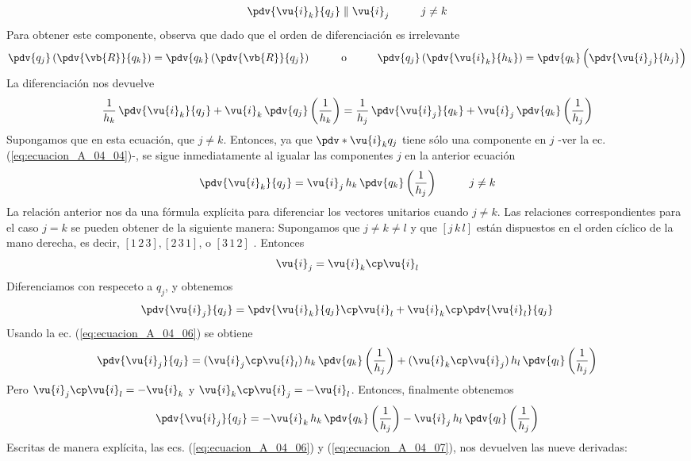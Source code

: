 \begin{align}
\pdv{\vu{i}_{k}}{q_{j}} \parallel \vu{i}_{j} \hspace{1cm} j \neq k 
\label{eq:ecuacion_A_04_04}    
\end{align}
Para obtener este componente, observa que dado que el orden de diferenciación es irrelevante
\begin{align*}
\pdv{q_{j}} \left( \pdv{\vb{R}}{q_{k}} \right) = \pdv{q_{k}} \left( \pdv{\vb{R}}{q_{j}} \right) \hspace{1cm} \mbox{o} \hspace{1cm} \pdv{q_{j}} \left( \pdv{\vu{i}_{k}}{h_{k}} \right) = \pdv{q_{k}} \left( \pdv{\vu{i}_{j}}{h_{j}} \right)
\end{align*}
La diferenciación nos devuelve
\begin{align}
\dfrac{1}{h_{k}} \, \pdv{\vu{i}_{k}}{q_{j}} + \vu{i}_{k} \, \pdv{q_{j}} \left( \dfrac{1}{h_{k}} \right) = \dfrac{1}{h_{j}} \, \pdv{\vu{i}_{j}}{q_{k}} + \vu{i}_{j} \, \pdv{q_{k}} \left( \dfrac{1}{h_{j}} \right)
\label{eq:ecuacion_A_04_05}    
\end{align}
Supongamos que en esta ecuación, que $j \neq k$. Entonces, ya que $\pdv*{\vu{i}_{k}}{q_{j}}$ tiene sólo una componente en $j$ -ver la ec. (\ref{eq:ecuacion_A_04_04})-, se sigue inmediatamente al igualar las componentes $j$ en la anterior ecuación
\begin{align}
\pdv{\vu{i}_{k}}{q_{j}} = \vu{i}_{j} \, h_{k} \, \pdv{q_{k}} \left( \dfrac{1}{h_{j}} \right) \hspace{1cm} j \neq k
\label{eq:ecuacion_A_04_06}    
\end{align}
La relación anterior nos da una fórmula explícita para diferenciar los vectores unitarios cuando $j \neq k$. Las relaciones correspondientes para el caso $j = k$ se pueden obtener de la siguiente manera: Supongamos que $j \neq k \neq l$ y que $[j \, k \, l]$ están dispuestos en el orden cíclico de la mano derecha, es decir, $[1 \, 2 \, 3], [2 \, 3 \,1]$, o $[3 \, 1 \, 2]$ . Entonces
\begin{align*}
\vu{i}_{j} = \vu{i}_{k} \cp \vu{i}_{l}
\end{align*}
Diferenciamos con respeceto a $q_{j}$, y obtenemos
\begin{align*}
\pdv{\vu{i}_{j}}{q_{j}} = \pdv{\vu{i}_{k}}{q_{j}} \cp \vu{i}_{l} + \vu{i}_{k} \cp \pdv{\vu{i}_{l}}{q_{j}}
\end{align*}
Usando la ec. (\ref{eq:ecuacion_A_04_06}) se obtiene
\begin{align*}
\pdv{\vu{i}_{j}}{q_{j}} = (\vu{i}_{j} \cp \vu{i}_{l}) \, h_{k} \, \pdv{q_{k}} \left( \dfrac{1}{h_{j}} \right) + (\vu{i}_{k} \cp \vu{i}_{j}) \, h_{l} \, \pdv{q_{l}} \left( \dfrac{1}{h_{j}} \right)
\end{align*}
Pero $\vu{i}_{j} \cp \vu{i}_{l} = - \vu{i}_{k}$ y $\vu{i}_{k} \cp \vu{i}_{j} = - \vu{i}_{l}$. Entonces, finalmente obtenemos
\begin{align}
\pdv{\vu{i}_{j}}{q_{j}} = - \vu{i}_{k} \, h_{k} \, \pdv{q_{k}} \left( \dfrac{1}{h_{j}} \right) - \vu{i}_{j} \, h_{l} \, \pdv{q_{l}} \left( \dfrac{1}{h_{j}} \right)
\label{eq:ecuacion_A_04_07}    
\end{align}
Escritas de manera explícita, las ecs. (\ref{eq:ecuacion_A_04_06}) y (\ref{eq:ecuacion_A_04_07}), nos devuelven las nueve derivadas:
